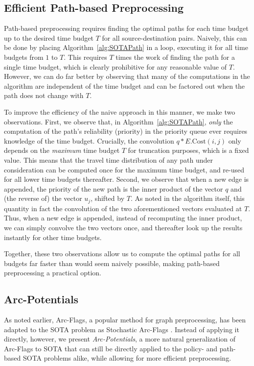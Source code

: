 \documentclass[oribibl]{llncs}
\begin{document}
	\subsection{Efficient Path-based Preprocessing}
		Path-based preprocessing requires finding the optimal paths for each time budget up to the desired time
		budget $T$ for all source-destination pairs.
		Naively, this can be done by placing Algorithm~\ref{alg:SOTAPath} in a loop,
		executing it for all time budgets from $1$ to $T$.
		This requires $T$ times the work of finding the path for a single time budget,
		which is clearly prohibitive for any reasonable value of $T$.
		However, we can do far better by observing that many of the computations in the algorithm are
		independent of the time budget and can be factored out when the path does not change with $T$.

		To improve the efficiency of the naive approach in this manner, we make two observations.
		First, we observe that, in Algorithm~\ref{alg:SOTAPath}, \textit{only} the computation of
		the path's reliability (priority) in the priority queue ever requires knowledge of the time budget.
		Crucially, the convolution $q \ast E.\mathrm{Cost}(i, j)$ only depends on the \textit{maximum}
		time budget $T$ for truncation purposes, which is a fixed value.
		This means that the travel time distribution of any path under consideration can be computed
		once for the maximum time budget, and re-used for all lower time budgets thereafter.
		Second, we observe that when a new edge is appended, the priority of the new path is the inner product
		of the vector $q$ and (the reverse of) the vector $u_j$, shifted by $T$.
		As noted in the algorithm itself, this quantity in fact the convolution
		of the two aforementioned vectors evaluated at $T$.
		Thus, when a new edge is appended, instead of recomputing the inner product, we can simply
		convolve the two vectors once, and thereafter look up the results instantly for other time budgets.

		Together, these two observations allow us to compute the optimal paths for all budgets far faster than
		would seem naively possible, making path-based preprocessing a practical option.

	\subsection{Arc-Potentials}
		As noted earlier, Arc-Flags, a popular method for graph preprocessing,
		has been adapted to the SOTA problem as Stochastic Arc-Flags \cite*{sabran2014precomputation}.
		Instead of applying it directly, however, we present \textit{Arc-Potentials}, a more
		natural generalization of Arc-Flags to SOTA that can still be directly applied to the policy- and
		path-based SOTA problems alike, while allowing for more efficient preprocessing.
\end{document}
